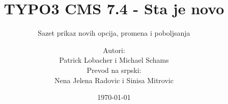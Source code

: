 %

%
%

\documentclass[t]{beamer}

\beamertemplatenavigationsymbolsempty

{
	\usetheme{typo3slides}
}

\title{TYPO3 CMS 7.4 - Sta je novo}
\subtitle{Sazet prikaz novih opcija, promena i poboljsanja}
\author{
	\centerline{Autori:}
	\centerline{Patrick Lobacher i Michael Schams}
	\centerline{Prevod na srpski:}
	\centerline{Nena Jelena Radovic i Sinisa Mitrovic}
}

\date{\today}



\sharefont


\begingroup
	[default]
	\begin{frame}
		\titlepage
	\end{frame}
\endgroup


\section*{TYPO3 CMS 7.4 - Sta je novo}
\begin{frame}[fragile]
	\frametitle{Sadrzaj}
	\framesubtitle{Sadrzaj}

	\tableofcontents

\end{frame}

